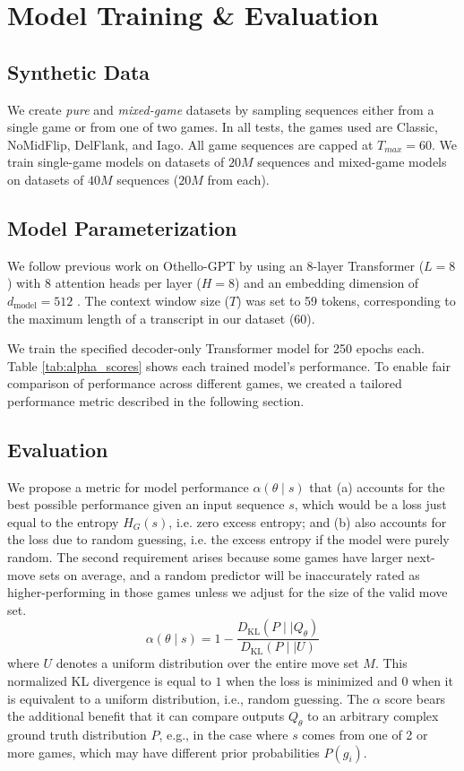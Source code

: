 \documentclass{article}
\theoremstyle{plain}
\theoremstyle{definition}
\theoremstyle{remark}
\begin{document}
\section{Model Training \& Evaluation}
\subsection{Synthetic Data}
We create \textit{pure} and \textit{mixed-game} datasets by sampling sequences either from a single game or from one of two games. In all tests, the games used are Classic, NoMidFlip, DelFlank, and Iago. All game sequences are capped at $T_{max} = 60$. We train single-game models on datasets of $20M$ sequences and mixed-game models on datasets of $40M$ sequences ($20M$ from each).

\subsection{Model Parameterization}
We follow previous work on Othello-GPT by using an 8-layer Transformer ($L=8$) with 8 attention heads per layer ($H=8$) and an embedding dimension of $d_{\text{model}} = 512$ \cite{li_emergent_2024}. The context window size ($T$) was set to 59 tokens, corresponding to the maximum length of a transcript in our dataset (60).

We train the specified decoder-only Transformer model for 250 epochs each. Table \ref{tab:alpha_scores} shows each trained model's performance. To enable fair comparison of performance across different games, we created a tailored performance metric described in the following section.


\subsection{Evaluation}
We propose a metric for model performance $\alpha(\theta \mid s)$ that (a) accounts for the best possible performance given an input sequence $s$, which would be a loss just equal to the entropy $H_G(s)$, i.e. zero excess entropy; and (b) also accounts for the loss due to random guessing, i.e. the excess entropy if the model were purely random. The second requirement arises because some games have larger next-move sets on average, and a random predictor will be inaccurately rated as higher-performing in those games unless we adjust for the size of the valid move set.
\begin{equation}
    \alpha(\theta \mid s) = 1 - \dfrac{D_\text{KL}(P\mid \mid Q_{\theta})}{D_\text{KL}(P \mid \mid U)}
\end{equation}
where $U$ denotes a uniform distribution over the entire move set $M$. This normalized KL divergence is equal to $1$ when the loss is minimized and $0$ when it is equivalent to a uniform distribution, i.e., random guessing. The $\alpha$ score bears the additional benefit that it can compare outputs $Q_\theta$ to an arbitrary complex ground truth distribution $P$, e.g., in the case where $s$ comes from one of 2 or more games, which may have different prior probabilities $P(g_i)$.
\end{document}
